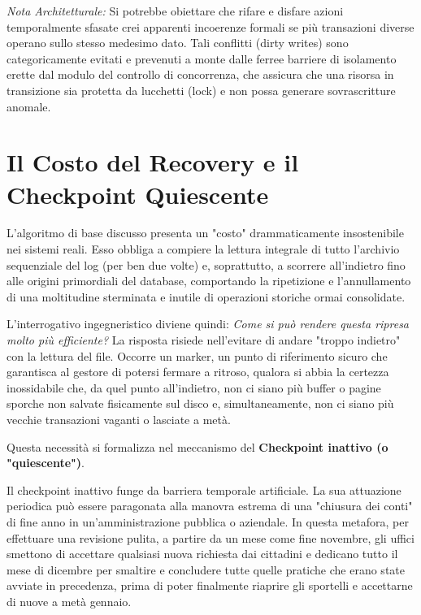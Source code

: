 \textit{Nota Architetturale:} Si potrebbe obiettare che rifare e disfare azioni temporalmente sfasate crei apparenti incoerenze formali se più transazioni diverse operano sullo stesso medesimo dato. Tali conflitti (dirty writes) sono categoricamente evitati e prevenuti a monte dalle ferree barriere di isolamento erette dal modulo del controllo di concorrenza, che assicura che una risorsa in transizione sia protetta da lucchetti (lock) e non possa generare sovrascritture anomale.

\section{Il Costo del Recovery e il Checkpoint Quiescente}

L'algoritmo di base discusso presenta un "costo" drammaticamente insostenibile nei sistemi reali. Esso obbliga a compiere la lettura integrale di tutto l'archivio sequenziale del log (per ben due volte) e, soprattutto, a scorrere all'indietro fino alle origini primordiali del database, comportando la ripetizione e l'annullamento di una moltitudine sterminata e inutile di operazioni storiche ormai consolidate.

L'interrogativo ingegneristico diviene quindi: \textit{Come si può rendere questa ripresa molto più efficiente?} La risposta risiede nell'evitare di andare "troppo indietro" con la lettura del file. Occorre un marker, un punto di riferimento sicuro che garantisca al gestore di potersi fermare a ritroso, qualora si abbia la certezza inossidabile che, da quel punto all'indietro, non ci siano più buffer o pagine sporche non salvate fisicamente sul disco e, simultaneamente, non ci siano più vecchie transazioni vaganti o lasciate a metà.

Questa necessità si formalizza nel meccanismo del \textbf{Checkpoint inattivo (o "quiescente")}.

Il checkpoint inattivo funge da barriera temporale artificiale. La sua attuazione periodica può essere paragonata alla manovra estrema di una "chiusura dei conti" di fine anno in un'amministrazione pubblica o aziendale. In questa metafora, per effettuare una revisione pulita, a partire da un mese come fine novembre, gli uffici smettono di accettare qualsiasi nuova richiesta dai cittadini e dedicano tutto il mese di dicembre per smaltire e concludere tutte quelle pratiche che erano state avviate in precedenza, prima di poter finalmente riaprire gli sportelli e accettarne di nuove a metà gennaio.


